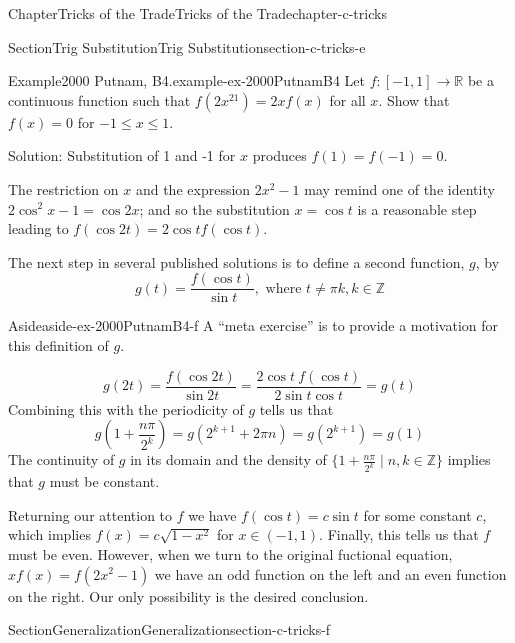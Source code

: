 \documentclass[oneside,10pt,]{book}
\numberwithin{equation}{section}
\begin{document}
\begin{chapterptx}{Chapter}{Tricks of the Trade}{}{Tricks of the Trade}{}{}{chapter-c-tricks}
\begin{sectionptx}{Section}{Trig Substitution}{}{Trig Substitution}{}{}{section-c-tricks-e}
\begin{example}{Example}{2000 Putnam, B4.}{example-ex-2000PutnamB4}%
Let \(f:[-1,1]\rightarrow \mathbb{R}\) be a continuous function such that \(f(2x^21)=2xf(x)\) for all \(x\). Show that \(f(x)=0\) for \(-1 \leq x \leq 1\).%
\par
Solution: Substitution of 1 and -1 for \(x\) produces \(f(1)=f(-1)=0\).%
\par
The restriction on \(x\) and the expression \(2 x^2 -1\) may remind one of the identity \(2\cos^2{x} - 1 = \cos{2 x}\); and so the substitution \(x = \cos{t}\) is a reasonable step leading to \(f(\cos{2t})=2 \cos{t} f(\cos{t})\).%
\par
The next step in several published solutions is to define a second function, \(g\), by%
\begin{equation*}
g(t)=\frac{f(\cos{t})}{\sin{t}}, \textrm{ where } t\neq \pi k, k\in \mathbb{Z}
\end{equation*}
%
\begin{aside}{Aside}{}{aside-ex-2000PutnamB4-f}%
A ``meta exercise'' is to provide a motivation for this definition of \(g\).%
\end{aside}
%
\begin{equation*}
g(2t)=\frac{f(\cos{2t})}{\sin{2t}}=\frac{2 \cos{t}\: f(\cos{t})}{2\sin{t}\cos{t}}=g(t)
\end{equation*}
Combining this with the periodicity of \(g\) tells us that%
\begin{equation*}
g(1+\frac{n \pi}{2^k})=g(2^{k+1}+2 \pi n) = g(2^{k+1})=g(1)
\end{equation*}
The continuity of \(g\) in its domain and the density of \(\{1+\frac{n \pi}{2^k} \mid n,k \in \mathbb{Z}\}\) implies that \(g\) must be constant.%
\par
Returning our attention to \(f\) we have \(f(\cos{t})= c \sin{t}\) for some constant \(c\), which implies \(f(x) = c \sqrt{1-x^2}\) for \(x \in (-1,1)\).  Finally, this tells us that \(f\) must be even.  However, when we turn to the original fuctional equation, \(x f(x)=f(2x^2-1)\) we have an odd function on the left and an even function on the right.  Our only possibility is the desired conclusion.%
\end{example}
\end{sectionptx}
%
%
\typeout{************************************************}
\typeout{************************************************}
%
\begin{sectionptx}{Section}{Generalization}{}{Generalization}{}{}{section-c-tricks-f}

\end{sectionptx}
\end{chapterptx}
\end{document}
